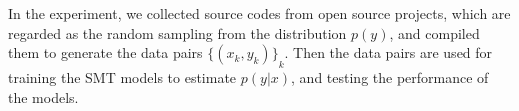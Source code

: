 \documentclass[11pt]{jarticle}
\newcommand{\argmax}{\mathop{\rm arg\,max}\limits}
\begin{document}
In the experiment, we collected source codes from open source projects, which are regarded as the random sampling from the distribution $ p(y) $, 
and compiled them to generate the data pairs $ {\{(x_k,y_k)\}}_k $.
Then the data pairs are used for training the SMT models to estimate $p(y|x)$, and testing the performance of the models.




\end{document}
